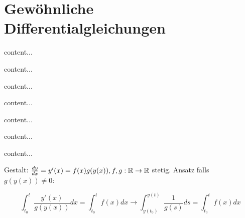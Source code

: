 \begin{satz}
	
\end{satz}

\pagebreak

\section{Gewöhnliche Differentialgleichungen}

\begin{definition}[Gebiet]
	content...
\end{definition}

\begin{definition}
	content...
\end{definition}

\begin{satz}
	content...
\end{satz}

\begin{definition}
	content...
\end{definition}

\begin{satz}
	content...
\end{satz}

\begin{satz}
	content...
\end{satz}

\begin{definition}
	content...
\end{definition}

\begin{satz}
	
	Gestalt: $\frac{d y}{d x} = y'(x) = f(x)g(y(x)), f,g : \mathbb{R} \rightarrow \mathbb{R}$ stetig. Ansatz falls $g(y(x)) \neq 0$:
	
	\begin{equation*}
		\int_{t_0}^{t} \frac{y'(x)}{g(y(x))} dx = \int_{t_0}^{t} f(x) dx \rightarrow \int_{y(t_0)}^{y(t)} \frac{1}{g(s)} ds = \int_{t_0}^{t} f(x) dx
	\end{equation*}
\end{satz}


